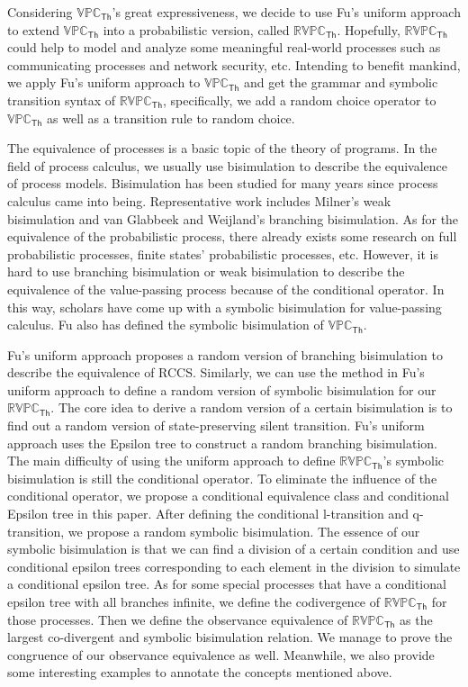 \begin{digest}
  Considering $\mathbb{VPC}_{\mathsf{Th}}$'s great expressiveness, we decide to use Fu's uniform approach to extend $\mathbb{VPC}_{\mathsf{Th}}$ into a probabilistic version, called $\mathbb{RVPC}_{\mathsf{Th}}$. Hopefully, $\mathbb{RVPC}_{\mathsf{Th}}$ could help to model and analyze some meaningful real-world processes such as communicating processes and network security, etc. Intending to benefit mankind, we apply Fu's uniform approach to $\mathbb{VPC}_{\mathsf{Th}}$ and get the grammar and symbolic transition syntax of $\mathbb{RVPC}_{\mathsf{Th}}$, specifically, we add a random choice operator to $\mathbb{VPC}_{\mathsf{Th}}$ as well as a transition rule to random choice. 
  
  The equivalence of processes is a basic topic of the theory of programs. In the field of process calculus, we usually use bisimulation to describe the equivalence of process models. Bisimulation has been studied for many years since process calculus came into being. Representative work includes Milner's weak bisimulation and van Glabbeek and Weijland's branching bisimulation. As for the equivalence of the probabilistic process, there already exists some research on full probabilistic processes, finite states' probabilistic processes, etc. However, it is hard to use branching bisimulation or weak bisimulation to describe the equivalence of the value-passing process because of the conditional operator. In this way, scholars have come up with a symbolic bisimulation for value-passing calculus. Fu also has defined the symbolic bisimulation of $\mathbb{VPC}_{\mathsf{Th}}$. 
  
  Fu's uniform approach proposes a random version of branching bisimulation to describe the equivalence of RCCS. Similarly, we can use the method in Fu's uniform approach to define a random version of symbolic bisimulation for our $\mathbb{RVPC}_{\mathsf{Th}}$. The core idea to derive a random version of a certain bisimulation is to find out a random version of state-preserving silent transition. Fu's uniform approach uses the Epsilon tree to construct a random branching bisimulation. The main difficulty of using the uniform approach to define $\mathbb{RVPC}_{\mathsf{Th}}$'s symbolic bisimulation is still the conditional operator. To eliminate the influence of the conditional operator, we propose a conditional equivalence class and conditional Epsilon tree in this paper. After defining the conditional l-transition and q-transition, we propose a random symbolic bisimulation. The essence of our symbolic bisimulation is that we can find a division of a certain condition and use conditional epsilon trees corresponding to each element in the division to simulate a conditional epsilon tree. As for some special processes that have a conditional epsilon tree with all branches infinite, we define the codivergence of $\mathbb{RVPC}_{\mathsf{Th}}$ for those processes. Then we define the observance equivalence of $\mathbb{RVPC}_{\mathsf{Th}}$ as the largest co-divergent and symbolic bisimulation relation. We manage to prove the congruence of our observance equivalence as well. Meanwhile, we also provide some interesting examples to annotate the concepts mentioned above.
  

\end{digest}
